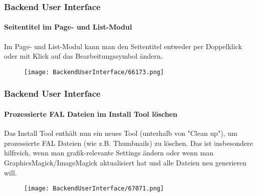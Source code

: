 %
\begin{frame}[fragile]
	\frametitle{Backend User Interface}
	\framesubtitle{Seitentitel im Page- und List-Modul}

	Im Page- und List-Modul kann man den Seitentitel entweder per Doppelklick
	oder mit Klick auf das Bearbeitungssymbol ändern.

	\begin{figure}
		\texttt{[image: BackendUserInterface/66173.png]}
	\end{figure}

\end{frame}

\begin{frame}[fragile]
	\frametitle{Backend User Interface}
	\framesubtitle{Prozessierte FAL Dateien im Install Tool löschen}

	Das Install Tool enthält nun ein neues Tool (unterhalb von "Clean up"), um
	prozessierte FAL Dateien (wie z.B. Thumbnails) zu löschen. Das ist
	insbesondere hilfreich, wenn man grafik-relevante Settings ändern oder wenn
	man GraphicsMagick/ImageMagick aktualisiert hat und alle Dateien neu
	generieren will.

	\begin{figure}
		\texttt{[image: BackendUserInterface/67071.png]}
	\end{figure}

\end{frame}

